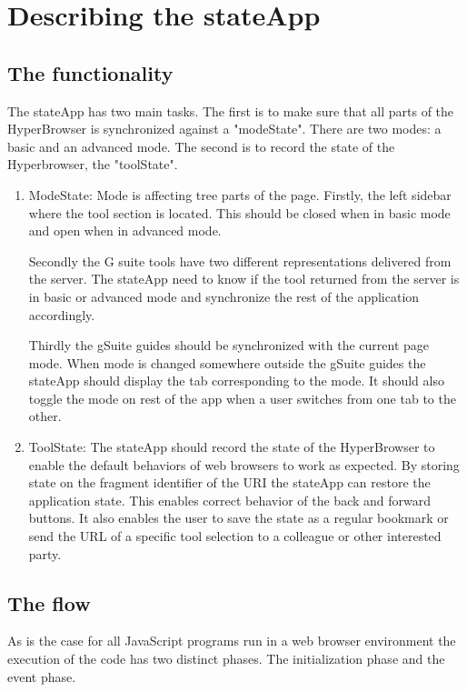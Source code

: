 \documentclass[english]{ifimaster}
\begin{document}
\section{Describing the stateApp}
\subsection{The functionality}
The stateApp has two main tasks. The first is to make sure that all parts of the HyperBrowser is synchronized against a "modeState". There are two modes: a basic and an advanced mode. The second is to record the state of the Hyperbrowser, the "toolState".

\begin{enumerate}
\item{ModeState:}
 Mode is affecting tree parts of the page. Firstly, the left sidebar where the tool section is located. This should be closed when in basic mode and open when in advanced mode. 

Secondly the G suite tools have two different representations delivered from the server. The stateApp need to know if the tool returned from the server is in basic or advanced mode and synchronize the rest of the application accordingly.

Thirdly the gSuite guides should be synchronized with the current page mode. When mode is changed somewhere outside the gSuite guides the stateApp should display the tab corresponding to the mode. It should also toggle the mode on rest of the app when a user switches from one tab to the other. 

\item{ToolState:}
The stateApp should record the state of the HyperBrowser to enable the default behaviors of web browsers to work as expected. By storing state on the fragment identifier of the URI the stateApp can restore the application state. This enables correct behavior of the back and forward buttons. It also enables the user to save the state as a regular bookmark or send the URL of a specific tool selection to a colleague or other interested party.
\end{enumerate}

\subsection{The flow}
As is the case for all JavaScript programs run in a web browser environment the execution of the code has two distinct phases. The initialization phase and the event phase\parencite[p.317]{flanagan}.
\end{document}
